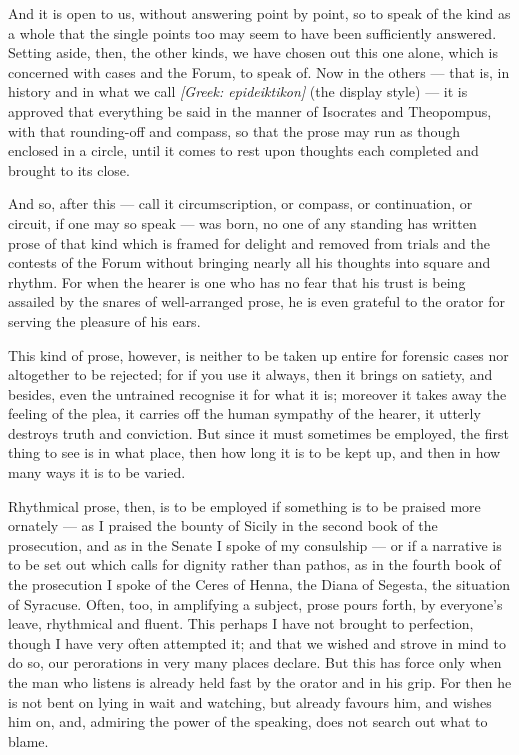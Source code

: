  And it is open to us, without answering point by point, so to speak of the kind as a whole that the single points too may seem to have been sufficiently answered. Setting aside, then, the other kinds, we have chosen out this one alone, which is concerned with cases and the Forum, to speak of. Now in the others — that is, in history and in what we call \textit{[Greek: epideiktikon]} (the display style) — it is approved that everything be said in the manner of Isocrates and Theopompus, with that rounding-off and compass, so that the prose may run as though enclosed in a circle, until it comes to rest upon thoughts each completed and brought to its close.

 And so, after this — call it circumscription, or compass, or continuation, or circuit, if one may so speak — was born, no one of any standing has written prose of that kind which is framed for delight and removed from trials and the contests of the Forum without bringing nearly all his thoughts into square and rhythm. For when the hearer is one who has no fear that his trust is being assailed by the snares of well-arranged prose, he is even grateful to the orator for serving the pleasure of his ears.

 This kind of prose, however, is neither to be taken up entire for forensic cases nor altogether to be rejected; for if you use it always, then it brings on satiety, and besides, even the untrained recognise it for what it is; moreover it takes away the feeling of the plea, it carries off the human sympathy of the hearer, it utterly destroys truth and conviction. But since it must sometimes be employed, the first thing to see is in what place, then how long it is to be kept up, and then in how many ways it is to be varied.

 Rhythmical prose, then, is to be employed if something is to be praised more ornately — as I praised the bounty of Sicily in the second book of the prosecution, and as in the Senate I spoke of my consulship — or if a narrative is to be set out which calls for dignity rather than pathos, as in the fourth book of the prosecution I spoke of the Ceres of Henna, the Diana of Segesta, the situation of Syracuse. Often, too, in amplifying a subject, prose pours forth, by everyone's leave, rhythmical and fluent. This perhaps I have not brought to perfection, though I have very often attempted it; and that we wished and strove in mind to do so, our perorations in very many places declare. But this has force only when the man who listens is already held fast by the orator and in his grip. For then he is not bent on lying in wait and watching, but already favours him, and wishes him on, and, admiring the power of the speaking, does not search out what to blame.

